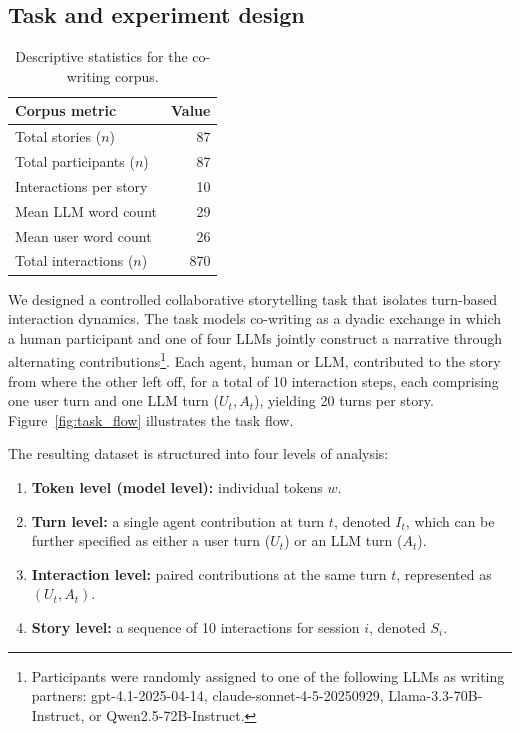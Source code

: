 \documentclass[11pt]{article}
\begin{document}
\subsection{Task and experiment design}
\begin{table}[t]
\centering
\small
\setlength{\tabcolsep}{6pt}
\renewcommand{\arraystretch}{1.2}
\begin{tabular}{l r}
\toprule
\textbf{Corpus metric} & \textbf{Value} \\
\midrule
Total stories ($n$) & 87\\
Total participants ($n$) & 87\\
Interactions per story& 10 \\
Mean LLM word count& 29\\
 Mean user word count&26\\
Total interactions ($n$) & 870\\
\bottomrule
\end{tabular}
\caption{Descriptive statistics for the co-writing corpus.}
\label{tab:corpus_descriptives}
\end{table}

We designed a controlled collaborative storytelling task that isolates turn-based interaction dynamics. The task models co-writing as a dyadic exchange in which a human participant and one of four LLMs jointly construct a narrative through alternating contributions\footnote{Participants were randomly assigned to one of the following LLMs as writing partners: gpt-4.1-2025-04-14, claude-sonnet-4-5-20250929, Llama-3.3-70B-Instruct, or Qwen2.5-72B-Instruct.}.
Each agent, human or LLM, contributed to the story from where the other left off, for a total of 10 interaction steps, each comprising one user turn and one LLM turn ($U_t, A_t$), yielding 20 turns per story.
Figure~\ref{fig:task_flow} illustrates the task flow. 

The resulting dataset is structured into four levels of analysis:

\begin{enumerate}
    \item \textbf{Token level (model level):} individual tokens $w$.
    \item \textbf{Turn level:} a single agent contribution at turn $t$, denoted $I_t$, which can be further specified as either a user turn ($U_t$) or an LLM turn ($A_t$).
    \item \textbf{Interaction level:} paired contributions at the same turn $t$, represented as $(U_t, A_t)$.
    \item \textbf{Story level:} a sequence of 10 interactions for session $i$, denoted $S_i$.
\end{enumerate}
\end{document}
